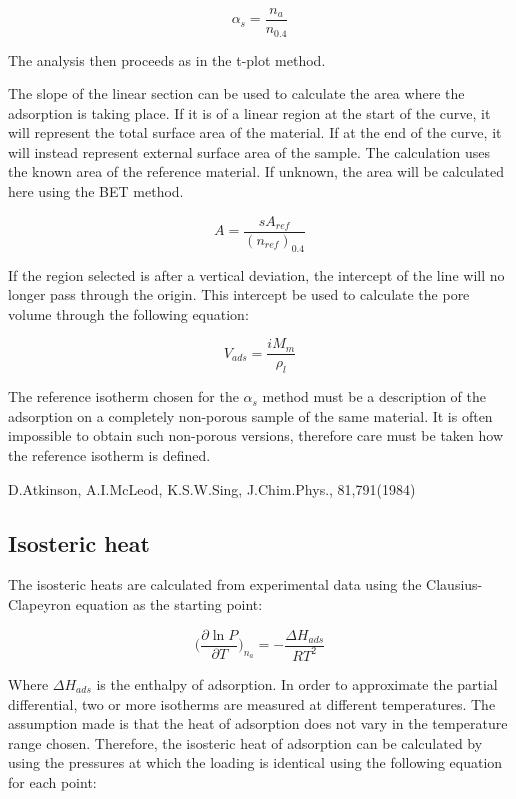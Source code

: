 \begin{equation}
	\alpha_s = \frac{n_a}{n_{0.4}}
\end{equation}

The analysis then proceeds as in the t-plot method.

The slope of the linear section can be used to calculate the area
where the adsorption is taking place. If it is of a linear region
at the start of the curve, it will represent the total surface area
of the material. If at the end of the curve, it will instead
represent external surface area of the sample.
The calculation uses the known area of the reference material.
If unknown, the area will be calculated here using the BET method.

\begin{equation}
	A = \frac{s A_{ref}}{(n_{ref})_{0.4}}
\end{equation}


If the region selected is after a vertical deviation, the intercept of the line
will no longer pass through the origin. This intercept be used to calculate the
pore volume through the following equation:

\begin{equation}
	V_{ads} = \frac{i M_m}{\rho_{l}}
\end{equation}


The reference isotherm chosen for the \(\alpha_s\) method must be a description
of the adsorption on a completely non-porous sample of the same material. It is
often impossible to obtain such non-porous versions, therefore care must be taken how the reference isotherm is defined.

D.Atkinson, A.I.McLeod, K.S.W.Sing, J.Chim.Phys., 81,791(1984)


\subsection{Isosteric heat}

The isosteric heats are calculated from experimental data using the Clausius-Clapeyron
equation as the starting point:

\begin{equation}
    \Big( \frac{\partial \ln P}{\partial T} \Big)_{n_a} = -\frac{\Delta H_{ads}}{R T^2}
\end{equation}

Where \(\Delta H_{ads}\) is the enthalpy of adsorption. In order to approximate the
partial differential, two or more isotherms are measured at different temperatures. The
assumption made is that the heat of adsorption does not vary in the temperature range
chosen. Therefore, the isosteric heat of adsorption can be calculated by using the pressures
at which the loading is identical using the following equation for each point:

